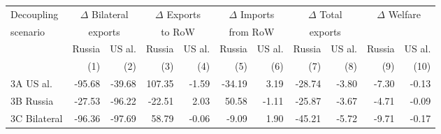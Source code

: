 \begin{tabular}{lrrrrrrrrrr}
  \hline
  Decoupling & \multicolumn{2}{c}{$\Delta$ Bilateral} & \multicolumn{2}{c}{$\Delta$ Exports} & \multicolumn{2}{c}{$\Delta$ Imports} & \multicolumn{2}{c}{$\Delta$ Total} & \multicolumn{2}{c}{$\Delta$ Welfare}\\
scenario & \multicolumn{2}{c}{exports} & \multicolumn{2}{c}{to RoW} & \multicolumn{2}{c}{from RoW} & \multicolumn{2}{c}{exports} & }\\\cmidrule{2-11}
& Russia & US al. & Russia & US al. & Russia & US al. & Russia & US al. & Russia & US al.} \\
& (1) & (2) & (3) & (4) & (5) & (6) & (7) & (8) & (9) & (10)} \\
 \hline
3A US al. & -95.68 & -39.68 & 107.35 & -1.59 & -34.19 & 3.19 & -28.74 & -3.80 & -7.30 & -0.13 \\ 
  3B Russia & -27.53 & -96.22 & -22.51 & 2.03 & 50.58 & -1.11 & -25.87 & -3.67 & -4.71 & -0.09 \\ 
  3C Bilateral & -96.36 & -97.69 & 58.79 & -0.06 & -9.09 & 1.90 & -45.21 & -5.72 & -9.71 & -0.17 \\ 
   \hline
\end{tabular}

